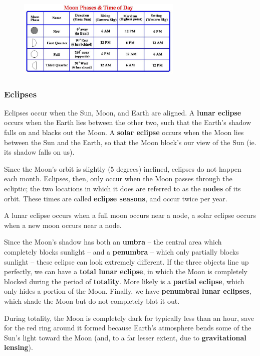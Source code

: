 \documentclass[12pt]{article}
\begin{document}
\begin{figure}[ht]
\centering
\includegraphics[width=0.7\textwidth]{moon_phases.jpg}
\end{figure}

\subsubsection{Eclipses}
Eclipses occur when the Sun, Moon, and Earth are aligned. A {\bf lunar eclipse} occurs when the Earth lies between the other two, such that the Earth's shadow falls on and blacks out the Moon. A {\bf solar eclipse} occurs when the Moon lies between the Sun and the Earth, so that the Moon block's our view of the Sun (ie. its shadow falls on us).

Since the Moon's orbit is slightly (5 degrees) inclined, eclipses do not happen each month. Eclipses, then, only occur when the Moon passes through the ecliptic; the two locations in which it does are referred to as the {\bf nodes} of its orbit. These times are called {\bf eclipse seasons}, and occur twice per year.

A lunar eclipse occurs when a full moon occurs near a node, a solar eclipse occurs when a new moon occurs near a node.

Since the Moon's shadow has both an {\bf umbra} -- the central area which completely blocks sunlight -- and a {\bf penumbra} -- which only partially blocks sunlight -- these eclipse can look extremely different. If the three objects line up perfectly, we can have a {\bf total lunar eclipse}, in which the Moon is completely blocked during the period of {\bf totality}. More likely is a {\bf partial eclipse}, which only hides a portion of the Moon. Finally, we have {\bf penumbral lunar eclipses}, which shade the Moon but do not completely blot it out.

During totality, the Moon is completely dark for typically less than an hour, save for the red ring around it formed because Earth's atmosphere bends some of the Sun's light toward the Moon (and, to a far lesser extent, due to {\bf gravitational lensing}).
\end{document}
